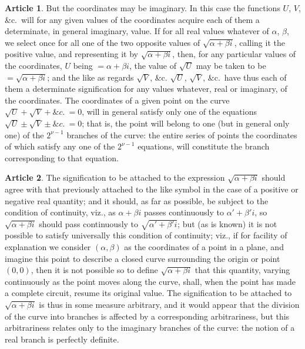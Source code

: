 \documentclass[11pt,a4paper]{article}
\theoremstyle{definition}
\newtheorem{art}{Article}
\begin{document}
\begin{art}
But the coordinates may be imaginary. In this case the functions $U$, $V$, \&c.\ will for any given values of the coordinates acquire each of them a determinate, in general imaginary, value. If for all real values whatever of $\alpha$, $\beta$, we select once for all one of the two opposite values of $\sqrt{\alpha + \beta i}$, calling it the positive value, and representing it by $\sqrt{\alpha + \beta i}$, then, for any particular values of the coordinates, $U$ being $= \alpha + \beta i$, the value of $\sqrt{U}$ may be taken to be $= \sqrt{\alpha + \beta i}$; and the like as regards $\sqrt{V}$, \&c. $\sqrt{U}$, $\sqrt{V}$, \&c.\ have thus each of them a determinate signification for any values whatever, real or imaginary, of the coordinates. The coordinates of a given point on the curve $\sqrt{U} + \sqrt{V} + \&c.\ = 0$, will in general satisfy only one of the equations $\sqrt{U} \pm \sqrt{V} \pm \&c.\ = 0$; that is, the point will belong to one (but in general only one) of the $2^{\nu-1}$ branches of the curve: the entire series of points the coordinates of which satisfy any one of the $2^{\nu-1}$ equations, will constitute the branch corresponding to that equation.
\end{art}

\begin{art}
The signification to be attached to the expression $\sqrt{\alpha + \beta i}$ should agree with that previously attached to the like symbol in the case of a positive or negative real quantity; and it should, as far as possible, be subject to the condition of continuity, viz., as $\alpha + \beta i$ passes continuously to $\alpha' + \beta' i$, so $\sqrt{\alpha + \beta i}$ should pass continuously to $\sqrt{\alpha' + \beta' i}$; but (as is known) it is not possible to satisfy universally this condition of continuity; viz., if for facility of explanation we consider $(\alpha, \beta)$ as the coordinates of a point in a plane, and imagine this point to describe a closed curve surrounding the origin or point $(0, 0)$, then it is not possible so to define $\sqrt{\alpha + \beta i}$ that this quantity, varying continuously as the point moves along the curve, shall, when the point has made a complete circuit, resume its original value. The signification to be attached to $\sqrt{\alpha + \beta i}$ is thus in some measure arbitrary, and it would appear that the division of the curve into branches is affected by a corresponding arbitrariness, but this arbitrariness relates only to the imaginary branches of the curve: the notion of a real branch is perfectly definite.
\end{art}
\end{document}

